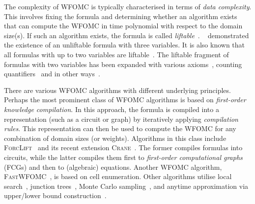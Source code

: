 \documentclass[letterpaper]{article} %
\theoremstyle{remark}
\theoremstyle{definition}
\begin{document}

The complexity of WFOMC is typically characterised in terms of \emph{data
  complexity}. This involves fixing the formula and determining whether an
algorithm exists that can compute the WFOMC in time polynomial with respect to
the domain size(s). If such an algorithm exists, the formula is called
\emph{liftable}~\cite{DBLP:conf/starai/JaegerB12}.
\citeauthor{DBLP:conf/pods/BeameBGS15}~
demonstrated the existence of an unliftable formula with three variables. It is
also known that all formulas with up to two variables are
liftable~\cite{DBLP:conf/nips/Broeck11,DBLP:conf/kr/BroeckMD14}. The liftable
fragment of formulas with two variables has been expanded with various
axioms~\cite{DBLP:conf/aaai/TothK23,DBLP:journals/ai/BremenK23}, counting
quantifiers~\cite{DBLP:journals/jair/Kuzelka21} and in other
ways~\cite{DBLP:conf/nips/KazemiKBP16}.


There are various WFOMC algorithms with different underlying principles. Perhaps
the most prominent class of WFOMC algorithms is based on \emph{first-order
  knowledge compilation}. In this approach, the formula is compiled into a
representation (such as a circuit or graph) by iteratively applying
\emph{compilation rules}. This representation can then be used to compute the
WFOMC for any combination of domain sizes (or weights). Algorithms in this class
include \textsc{ForcLift}~\cite{DBLP:conf/ijcai/BroeckTMDR11} and its recent
extension \textsc{Crane}~\cite{DBLP:conf/kr/DilkasB23}. The former compiles
formulas into circuits, while the latter compiles them first to
\emph{first-order computational graphs} (FCGs) and then to (algebraic)
equations. Another WFOMC algorithm,
\textsc{FastWFOMC}~\cite{DBLP:conf/uai/BremenK21}, is based on cell enumeration.
Other algorithms utilise local search~\cite{DBLP:journals/pvldb/NiuRDS11},
junction trees~\cite{DBLP:conf/aaai/VenugopalSG15}, Monte Carlo
sampling~\cite{DBLP:journals/cacm/GogateD16}, and anytime approximation via
upper/lower bound construction~\cite{DBLP:conf/ijcai/BremenK20}.

\end{document}
